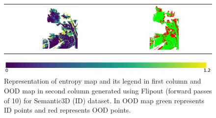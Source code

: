 \begin{figure}[h!]
\begin{tabular}{cc}
            \includegraphics[width=0.33\textwidth, height=0.18\textheight]{images/ood_imgs/fout_sem3d/fout_ent_3.pdf}& 
            \includegraphics[width=0.33\textwidth, height=0.18\textheight]{images/ood_imgs/fout_sem3d/fout_ent_ood_auroc_3.pdf}\\
        \end{tabular}
        \includegraphics[scale=0.45]{images/ent_legend.pdf}
        \caption{Representation of entropy map and its legend in first column and OOD map in second column generated using Flipout (forward passes of 10) for Semantic3D (ID) dataset. In OOD map green represents ID points and red represents OOD points.}
        \label{fig:fout_ood_auroc_sem3d_ent}
    \end{figure}

